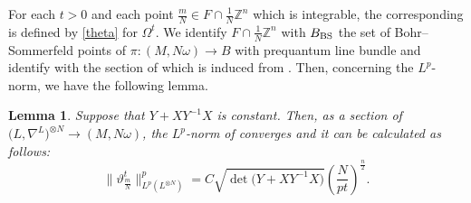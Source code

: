 \documentclass[10pt,a4paper]{amsart}
\numberwithin{equation}{section}
\newtheorem{Lemma}[Theorem]{Lemma}
\newcommand{\Z}{\mathbb{Z}}
\begin{document}
For each $t>0$ and each point $\frac{m}{N}\in F\cap \frac{1}{N}\Z^n$ which is integrable, the corresponding  is defined by \eqref{theta} for $\Omega^t$. We identify $F\cap \frac{1}{N}\Z^n$ with $B_{\rm BS}$ the set of Bohr--Sommerfeld points of $\pi \colon (M,N\omega)\to B$ with prequantum line bundle  and identify  with the section of  which is induced from . Then, concerning the $L^p$-norm, we have the following lemma.
\begin{Lemma}\label{norm of theta}
Suppose that $Y+XY^{-1}X$ is constant. Then, as a section of $\bigl(L,\nabla^L\bigr)^{\otimes N}\to (M,N\omega)$, the $L^p$-norm of  converges and it can be calculated as follows:
\begin{equation*}
\big\|\vartheta^t_{\frac{m}{N}}\big\|_{L^p(L^{\otimes N})}^p=C\sqrt{\det \bigl(Y+XY^{-1}X\bigr)}\left(\frac{N}{pt}\right)^\frac{n}{2}.
\end{equation*}
\end{Lemma}
\end{document}
